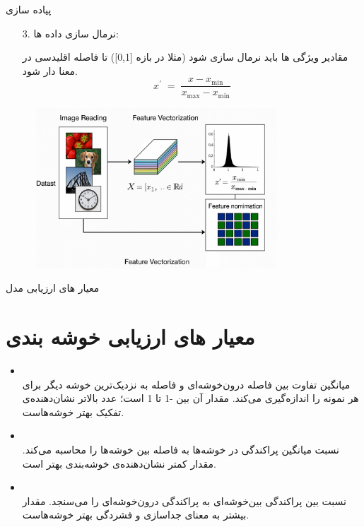 \documentclass[10pt]{beamer}
\begin{document}
\begin{frame}{پیاده سازی}
	\begin{footnotesize}
		\begin{enumerate}
			\item[3.]
	نرمال سازی داده ها:

مقادیر ویژگی ها باید نرمال سازی شود (مثلا در بازه [0,1]) تا فاصله اقلیدسی در  معنا دار شود.
\[
x^{\prime} \; = \; \frac{x-x_{\min}}{x_{\max} - x_{\min}}
\]

\begin{center}
	\includegraphics[height=6cm, width=10cm]{image_in_clustering}
\end{center}
		\end{enumerate}
	\end{footnotesize}

\end{frame}

\begin{frame}{معیار های ارزیابی مدل}
\section{ معیار های ارزیابی خوشه بندی }
\begin{itemize}
	\item \textbf{}\\
میانگین تفاوت بین فاصله درون‌خوشه‌ای و فاصله به نزدیک‌ترین خوشه دیگر برای هر نمونه را اندازه‌گیری می‌کند. مقدار آن بین -1 تا 1 است؛ عدد بالاتر نشان‌دهنده‌ی تفکیک بهتر خوشه‌هاست.
	\item \textbf{}\\
نسبت میانگین پراکندگی در خوشه‌ها به فاصله بین خوشه‌ها را محاسبه می‌کند. مقدار کمتر نشان‌دهنده‌ی خوشه‌بندی بهتر است.
	\item \textbf{}\\
نسبت بین پراکندگی بین‌خوشه‌ای به پراکندگی درون‌خوشه‌ای را می‌سنجد. مقدار بیشتر به معنای جداسازی و فشردگی بهتر خوشه‌هاست.
\end{itemize}	
\end{frame}
\end{document}
